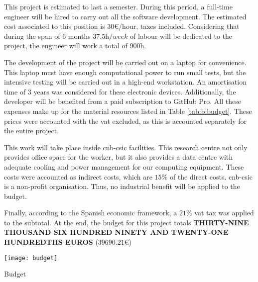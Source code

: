 \documentclass[../main.tex]{subfiles}
\begin{document}
This project is estimated to last a semester. During this period, a full-time engineer will be hired to carry out all the software development. The estimated cost associated to this position is $30$\euro/hour, taxes included. Considering that during the span of 6 months $37.5 \si{\hour/week}$ of labour will be dedicated to the project, the engineer will work a total of $900 \si{\hour}$.

The development of the project will be carried out on a laptop for convenience. This laptop must have enough computational power to run small tests, but the intensive testing will be carried out in a high-end workstation. An amortisation time of 3 years was considered for these electronic devices. Additionally, the developer will be benefited from a paid subscription to GitHub Pro. All these expenses make up for the material resources listed in Table \ref{tab:b:budget}. These prices were accounted with the \gls{vat} excluded, as this is accounted separately for the entire project.

This work will take place inside \gls{cnb}-\gls{csic} facilities. This research centre not only provides office space for the worker, but it also provides a data centre with adequate cooling and power management for our computing equipment. These costs were accounted as indirect costs, which are $15 \si{\percent}$ of the direct costs. \Gls{cnb}-\gls{csic} is a non-profit organisation. Thus, no industrial benefit will be applied to the budget.

Finally, according to the Spanish economic framework, a $21 \si{\percent}$ \gls{vat} tax was applied to the subtotal. At the end, the budget for this project totals \textbf{THIRTY-NINE THOUSAND SIX HUNDRED NINETY AND TWENTY-ONE HUNDREDTHS EUROS} ($39690.21$\euro)

\begin{table}[hbpt]
    \centering
    \texttt{[image: budget]}
    \caption{Budget}
    \label{tab:b:budget}
\end{table}
\end{document}
